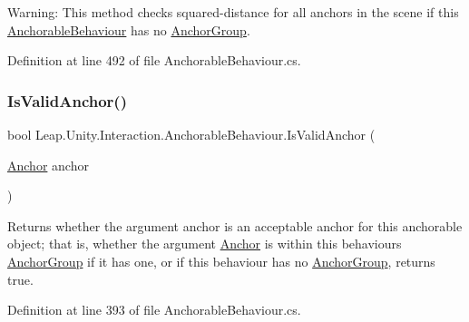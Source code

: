 Warning\+: This method checks squared-\/distance for all anchors in the scene if this \mbox{\hyperlink{class_leap_1_1_unity_1_1_interaction_1_1_anchorable_behaviour}{Anchorable\+Behaviour}} has no \mbox{\hyperlink{class_leap_1_1_unity_1_1_interaction_1_1_anchor_group}{Anchor\+Group}}. 

Definition at line 492 of file Anchorable\+Behaviour.\+cs.

\mbox{\label{class_leap_1_1_unity_1_1_interaction_1_1_anchorable_behaviour_a8e014a55c2402653af66bff1ea6b2ba9}} 
\subsubsection{\texorpdfstring{IsValidAnchor()}{IsValidAnchor()}}
{\footnotesize\ttfamily bool Leap.\+Unity.\+Interaction.\+Anchorable\+Behaviour.\+Is\+Valid\+Anchor (\begin{DoxyParamCaption}\item[{\mbox{\hyperlink{class_leap_1_1_unity_1_1_interaction_1_1_anchor}{Anchor}}}]{anchor }\end{DoxyParamCaption})}



Returns whether the argument anchor is an acceptable anchor for this anchorable object; that is, whether the argument \mbox{\hyperlink{class_leap_1_1_unity_1_1_interaction_1_1_anchor}{Anchor}} is within this behaviour\textquotesingle{}s \mbox{\hyperlink{class_leap_1_1_unity_1_1_interaction_1_1_anchor_group}{Anchor\+Group}} if it has one, or if this behaviour has no \mbox{\hyperlink{class_leap_1_1_unity_1_1_interaction_1_1_anchor_group}{Anchor\+Group}}, returns true. 



Definition at line 393 of file Anchorable\+Behaviour.\+cs.

\mbox{\label{class_leap_1_1_unity_1_1_interaction_1_1_anchorable_behaviour_a93ce5813c3ce4805451e93d5c5050d4e}} 
